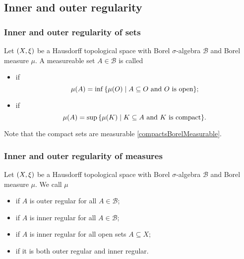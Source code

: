 \subsection{Inner and outer regularity}
\subsubsection{Inner and outer regularity of sets}
\begin{definition}
Let $\sSet{X, \xi}$ be a Hausdorff topological space with Borel $\sigma$-algebra $\mathcal{B}$ and Borel measure $\mu$. A measureable set $A\in\mathcal{B}$ is called
\begin{itemize}
\item {} if
\[ \mu(A) = \inf\setbuilder{\mu(O)}{\text{$A\subseteq O$ and $O$ is open}}; \]
\item {} if
\[ \mu(A) = \sup\setbuilder{\mu(K)}{\text{$K\subseteq A$ and $K$ is compact}}. \]
\end{itemize}
\end{definition}
Note that the compact sets are measurable \ref{compactsBorelMeasurable}.

\subsubsection{Inner and outer regularity of measures}
\begin{definition}
Let $\sSet{X, \xi}$ be a Hausdorff topological space with Borel $\sigma$-algebra $\mathcal{B}$ and Borel measure $\mu$. We call $\mu$
\begin{itemize}
\item {} if $A$ is outer regular for all $A\in \mathcal{B}$;
\item {} if $A$ is inner regular for all $A\in \mathcal{B}$;
\item {} if $A$ is inner regular for all open sets $A\subseteq X$;
\item {} if it is both outer regular and inner regular.
\end{itemize}
\end{definition}

